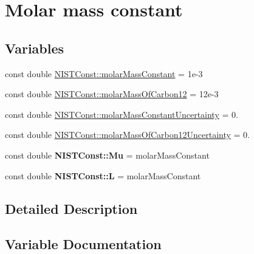 \hypertarget{group___molar_mass_constant}{}\section{Molar mass constant}
\label{group___molar_mass_constant}
\subsection*{Variables}
\begin{DoxyCompactItemize}
\item 
const double \hyperlink{group___molar_mass_constant_ga83c1719df0cda1b4eae15de014b8f857}{N\+I\+S\+T\+Const\+::molar\+Mass\+Constant} = 1e-\/3
\item 
const double \hyperlink{group___molar_mass_constant_gab1aae3b38f21cb9a15fdc8209d3cf1f0}{N\+I\+S\+T\+Const\+::molar\+Mass\+Of\+Carbon12} = 12e-\/3
\item 
const double \hyperlink{group___molar_mass_constant_ga7aea373fd7ef8740aa22140aab339ce8}{N\+I\+S\+T\+Const\+::molar\+Mass\+Constant\+Uncertainty} = 0.
\item 
const double \hyperlink{group___molar_mass_constant_gae2fea17985c3e8877e1baab9f9382676}{N\+I\+S\+T\+Const\+::molar\+Mass\+Of\+Carbon12\+Uncertainty} = 0.
\item 
\mbox{\label{group___molar_mass_constant_ga06104635bf45affb9e10a3f6581b4076}} 
const double {\bfseries N\+I\+S\+T\+Const\+::\+Mu} = molar\+Mass\+Constant
\item 
\mbox{\label{group___molar_mass_constant_ga0d410e47da7c9d6841958899d80e4b75}} 
const double {\bfseries N\+I\+S\+T\+Const\+::L} = molar\+Mass\+Constant
\end{DoxyCompactItemize}


\subsection{Detailed Description}


\subsection{Variable Documentation}
\mbox{\label{group___molar_mass_constant_ga83c1719df0cda1b4eae15de014b8f857}} 
